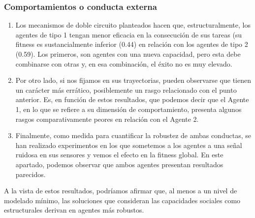 \subsubsection{Comportamientos o conducta externa}
\begin{enumerate}
  \item {Los mecanismos de doble circuito planteados hacen que, estructuralmente, los agentes de tipo 1 tengan menor eficacia en la consecución de sus tareas (su fitness es sustancialmente inferior (0.44) en relación con los agentes de tipo 2 (0.59). Los primeros,
  son agentes con una nueva capacidad, pero esta debe combinarse con otras y, en esa combinación, el éxito no es muy elevado.}
  \item {Por otro lado, si nos fijamos en sus trayectorias, pueden observarse que tienen un carácter más errático, posiblemente un rasgo relacionado con el punto anterior. Es, en función de estos resultados, que podemos decir que el Agente 1, en lo que se refiere a su dimensión de comportamiento,
  presenta algunos rasgos comparativamente peores en relación con el Agente 2.}
  \item {Finalmente, como medida para cuantificar la robustez de ambas conductas, se han realizado experimentos en los que sometemos a los agentes a una señal ruidosa en sus sensores y vemos el efecto en la fitness global. En este apartado, podemos observar que ambos agentes presentan resultados parecidos.}
\end{enumerate}

A la vista de estos resultados, podríamos afirmar que, al menos a un nivel de modelado mínimo, las soluciones que consideran las capacidades sociales como estructurales derivan en agentes más robustos.

